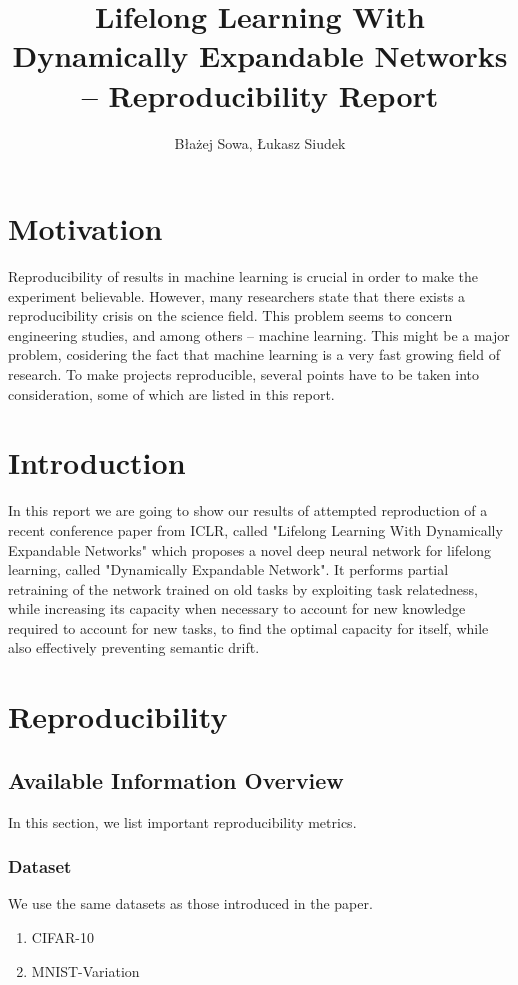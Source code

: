 \documentclass[12pt]{article}
\title{Lifelong Learning With Dynamically Expandable Networks -- Reproducibility Report }
\author{Błażej Sowa, Łukasz Siudek}
\date{}
\begin{document}
    \maketitle
    
    \section {Motivation}

    Reproducibility of results in machine learning is crucial in order to make the experiment believable.
    However, many researchers state that there exists a reproducibility crisis on the science field.
    This problem seems to concern engineering studies, and among others -- machine
    learning. This might be a major problem, cosidering the fact that machine learning is a very fast
    growing field of research.
    To make projects reproducible, several points have to be taken into consideration, some of which are
    listed in this report.
    
    \section{Introduction}
    
    In this report we are going to show our results of attempted reproduction of a
    recent conference paper from ICLR, called "Lifelong Learning With Dynamically
    Expandable Networks" which proposes a novel deep neural network for lifelong learning, called "Dynamically
    Expandable Network". It performs partial retraining of the network trained on old tasks by exploiting task
    relatedness, while increasing its capacity when necessary to account for new knowledge required
    to account for new tasks, to find the optimal capacity for itself, while also effectively preventing
    semantic drift.
    
    \section {Reproducibility}
    
    \subsection {Available Information Overview}
    
    In this section, we list important reproducibility metrics.  
    
    \subsubsection{Dataset}
    We use the same datasets as those introduced in the paper.
    \begin{enumerate}  
        \item CIFAR-10
        \item MNIST-Variation 
    \end{enumerate}
    
\end{document}

